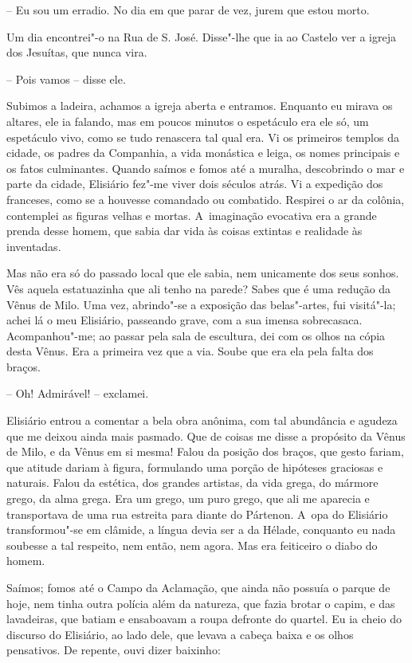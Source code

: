 -- Eu sou um erradio. No dia em que parar de vez, jurem que estou morto.

Um dia encontrei"-o na Rua de S. José. Disse"-lhe que ia ao Castelo ver a
igreja dos Jesuítas, que nunca vira.

-- Pois vamos -- disse ele.

Subimos a ladeira, achamos a igreja aberta e entramos. Enquanto eu
mirava os altares, ele ia falando, mas em poucos minutos o espetáculo
era ele só, um espetáculo vivo, como se tudo renascera tal qual era. Vi
os primeiros templos da cidade, os padres da Companhia, a vida monástica
e leiga, os nomes principais e os fatos culminantes. Quando saímos e
fomos até a muralha, descobrindo o mar e parte da cidade, Elisiário
fez"-me viver dois séculos atrás. Vi a expedição dos franceses, como se a
houvesse comandado ou combatido. Respirei o ar da colônia, contemplei as
figuras velhas e mortas. A~imaginação evocativa era a grande prenda
desse homem, que sabia dar vida às coisas extintas e realidade às
inventadas.

Mas não era só do passado local que ele sabia, nem unicamente dos seus
sonhos. Vês aquela estatuazinha que ali tenho na parede? Sabes que é uma
redução da Vênus de Milo. Uma vez, abrindo"-se a exposição das
belas"-artes, fui visitá"-la; achei lá o meu Elisiário, passeando grave,
com a sua imensa sobrecasaca. Acompanhou"-me; ao passar pela sala de
escultura, dei com os olhos na cópia desta Vênus. Era a primeira vez que
a via. Soube que era ela pela falta dos braços.

-- Oh! Admirável! -- exclamei.

Elisiário entrou a comentar a bela obra anônima, com tal abundância e
agudeza que me deixou ainda mais pasmado. Que de coisas me disse a
propósito da Vênus de Milo, e da Vênus em si mesma! Falou da posição dos
braços, que gesto fariam, que atitude dariam à figura, formulando uma
porção de hipóteses graciosas e naturais. Falou da estética, dos grandes
artistas, da vida grega, do mármore grego, da alma grega. Era um grego,
um puro grego, que ali me aparecia e transportava de uma rua estreita
para diante do Pártenon. A~opa do Elisiário transformou"-se em clâmide, a
língua devia ser a da Hélade, conquanto eu nada soubesse a tal respeito,
nem então, nem agora. Mas era feiticeiro o diabo do homem.

Saímos; fomos até o Campo da Aclamação, que ainda não possuía o parque
de hoje, nem tinha outra polícia além da natureza, que fazia brotar o
capim, e das lavadeiras, que batiam e ensaboavam a roupa defronte do
quartel. Eu ia cheio do discurso do Elisiário, ao lado dele, que levava
a cabeça baixa e os olhos pensativos. De repente, ouvi dizer baixinho:

